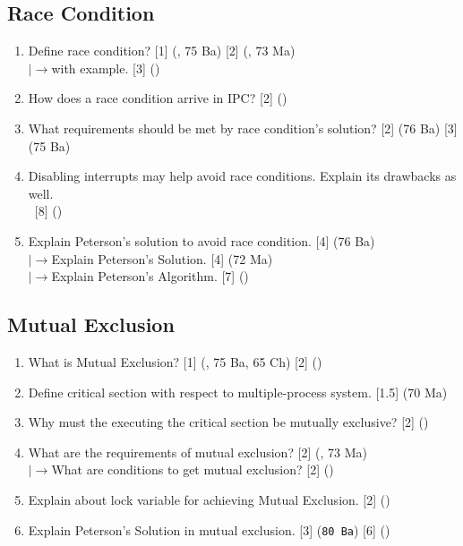 \documentclass[12pt]{article}
\newcommand{\lb}{\\$\left|\rightarrow\right.$}
\newcommand{\enter}{\\\textcolor{white}{1}}
\begin{document}
	\subsection{Race Condition}	
		\begin{enumerate}[noitemsep, topsep=0pt]
			\item Define race condition? \hfill [1] (, 75 Ba) [2] (, 73 Ma)
			\lb with example. \hfill [3] ()

			\item How does a race condition arrive in IPC? \hfill [2] ()
			
			\item What requirements should be met by race condition's solution? \hfill [2] (76 Ba) [3] (75 Ba)
			
			\item Disabling interrupts may help avoid race conditions. Explain its drawbacks as well.
			\enter\hfill [8] ()
			
			\item Explain Peterson's solution to avoid race condition. \hfill [4] (76 Ba)
			\lb Explain Peterson's Solution. \hfill [4] (72 Ma)
			\lb Explain Peterson's Algorithm. \hfill [7] ()
		\end{enumerate}
		
	\subsection{Mutual Exclusion}
		\begin{enumerate}[noitemsep, topsep=0pt]
			\item What is Mutual Exclusion? \hfill [1] (, 75 Ba, 65 Ch) [2] ()
			
			\item Define critical section with respect to multiple-process system. \hfill [1.5] (70 Ma)
			
			\item Why must the executing the critical section be mutually exclusive? \hfill [2] ()
			
			\item What are the requirements of mutual exclusion? \hfill [2] (, 73 Ma)
			\lb What are conditions to get mutual exclusion? \hfill [2] ()
			
			\item Explain about lock variable for achieving Mutual Exclusion. \hfill [2] ()
			
			\item Explain Peterson's Solution in mutual exclusion. \hfill [3] (\texttt{80 Ba}) [6] ()
		\end{enumerate}
		
\end{document}
